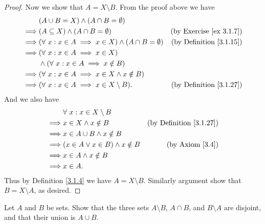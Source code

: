 \begin{proof}
    Now we show that \(A = X \setminus B\).
    From the proof above we have
    \begin{align*}
                 & (A \cup B = X) \land (A \cap B = \emptyset)                                                                \\
        \implies & (A \subseteq X) \land (A \cap B = \emptyset)                         & \text{(by Exercise \ref{ex 3.1.7})} \\
        \implies & (\forall\ x : x \in A \implies x \in X) \land (A \cap B = \emptyset) & \text{(by Definition \ref{3.1.15})} \\
        \implies & (\forall\ x : x \in A \implies x \in X)                                                                    \\
                 & \land (\forall\ x : x \in A \implies x \notin B)                                                           \\
        \implies & (\forall\ x : x \in A \implies x \in X \land x \notin B)                                                   \\
        \implies & (\forall\ x : x \in A \implies x \in X \setminus B).                 & \text{(by Definition \ref{3.1.27})}
    \end{align*}
    And we also have
    \begin{align*}
                 & \forall\ x : x \in X \setminus B                                              \\
        \implies & x \in X \land x \notin B                & \text{(by Definition \ref{3.1.27})} \\
        \implies & x \in A \cup B \land x \notin B                                               \\
        \implies & (x \in A \lor x \in B) \land x \notin B & \text{(by Axiom \ref{3.4})}         \\
        \implies & x \in A \land x \notin B                                                      \\
        \implies & x \in A.
    \end{align*}
    Thus by Definition \ref{3.1.4} we have \(A = X \setminus B\).
    Similarly argument show that \(B = X \setminus A\), as desired.
\end{proof}

\begin{exercise}\label{ex 3.1.10}
    Let \(A\) and \(B\) be sets.
    Show that the three sets \(A \setminus B\), \(A \cap B\), and \(B \setminus A\) are disjoint, and that their union is \(A \cup B\).
\end{exercise}

